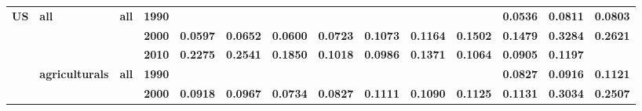\documentclass[
  authoryear,
  preprint,
  3p]{elsarticle}
\begin{document}
\begin{landscape}
\begin{longtable}[t]{>{}l>{}l>{}l>{}l>{}r>{}r>{}r>{}r>{}r>{}r>{}r>{}r>{}r>{}r}
\textbf{US} & \textbf{all} & \textbf{all} & \textbf{1990} & \textcolor[HTML]{4285f4}{\textbf{}} & \textcolor[HTML]{4285f4}{\textbf{}} & \textcolor[HTML]{4285f4}{\textbf{}} & \textcolor[HTML]{4285f4}{\textbf{}} & \textcolor[HTML]{4285f4}{\textbf{}} & \textcolor[HTML]{4285f4}{\textbf{}} & \textcolor[HTML]{4285f4}{\textbf{}} & \textcolor[HTML]{4285f4}{\textbf{0.0536}} & \textcolor[HTML]{4285f4}{\textbf{0.0811}} & \textcolor[HTML]{4285f4}{\textbf{0.0803}}\\
\textbf{} & \textbf{} & \textbf{} & \textbf{2000} & \textcolor[HTML]{4285f4}{\textbf{0.0597}} & \textcolor[HTML]{4285f4}{\textbf{0.0652}} & \textcolor[HTML]{4285f4}{\textbf{0.0600}} & \textcolor[HTML]{4285f4}{\textbf{0.0723}} & \textcolor[HTML]{4285f4}{\textbf{0.1073}} & \textcolor[HTML]{4285f4}{\textbf{0.1164}} & \textcolor[HTML]{4285f4}{\textbf{0.1502}} & \textcolor[HTML]{4285f4}{\textbf{0.1479}} & \textcolor[HTML]{4285f4}{\textbf{0.3284}} & \textcolor[HTML]{4285f4}{\textbf{0.2621}}\\
\addlinespace
\textbf{} & \textbf{} & \textbf{} & \textbf{2010} & \textcolor[HTML]{4285f4}{\textbf{0.2275}} & \textcolor[HTML]{4285f4}{\textbf{0.2541}} & \textcolor[HTML]{4285f4}{\textbf{0.1850}} & \textcolor[HTML]{4285f4}{\textbf{0.1018}} & \textcolor[HTML]{4285f4}{\textbf{0.0986}} & \textcolor[HTML]{4285f4}{\textbf{0.1371}} & \textcolor[HTML]{4285f4}{\textbf{0.1064}} & \textcolor[HTML]{4285f4}{\textbf{0.0905}} & \textcolor[HTML]{4285f4}{\textbf{0.1197}} & \textcolor[HTML]{4285f4}{\textbf{}}\\
\textbf{} & \textbf{agriculturals} & \textbf{all} & \textbf{1990} & \textcolor[HTML]{4285f4}{\textbf{}} & \textcolor[HTML]{4285f4}{\textbf{}} & \textcolor[HTML]{4285f4}{\textbf{}} & \textcolor[HTML]{4285f4}{\textbf{}} & \textcolor[HTML]{4285f4}{\textbf{}} & \textcolor[HTML]{4285f4}{\textbf{}} & \textcolor[HTML]{4285f4}{\textbf{}} & \textcolor[HTML]{4285f4}{\textbf{0.0827}} & \textcolor[HTML]{4285f4}{\textbf{0.0916}} & \textcolor[HTML]{4285f4}{\textbf{0.1121}}\\
\textbf{} & \textbf{} & \textbf{} & \textbf{2000} & \textcolor[HTML]{4285f4}{\textbf{0.0918}} & \textcolor[HTML]{4285f4}{\textbf{0.0967}} & \textcolor[HTML]{4285f4}{\textbf{0.0734}} & \textcolor[HTML]{4285f4}{\textbf{0.0827}} & \textcolor[HTML]{4285f4}{\textbf{0.1111}} & \textcolor[HTML]{4285f4}{\textbf{0.1090}} & \textcolor[HTML]{4285f4}{\textbf{0.1125}} & \textcolor[HTML]{4285f4}{\textbf{0.1131}} & \textcolor[HTML]{4285f4}{\textbf{0.3034}} & \textcolor[HTML]{4285f4}{\textbf{0.2507}}\\

\end{longtable}
\end{landscape}
\end{document}

